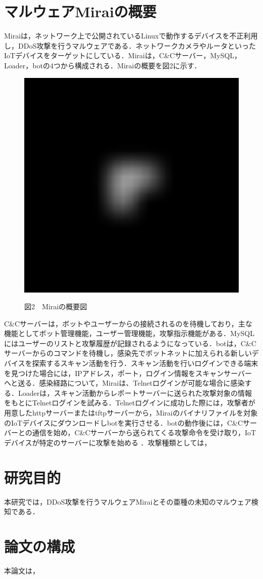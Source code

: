 \section{マルウェアMiraiの概要}

Miraiは，ネットワーク上で公開されているLinuxで動作するデバイスを不正利用し，DDoS攻撃を行うマルウェアである．ネットワークカメラやルータといったIoTデバイスをターゲットにしている．Miraiは，C\&Cサーバー，MySQL，Loader，botの4つから構成される．Miraiの概要を図2に示す．

\begin{figure}[h]
   \centering
      \includegraphics[width=150mm]{figures/test.eps}
   \label{fig:model}
   \begin{center}図2　Miraiの概要図\end{center}
\end{figure}

C\&Cサーバーは，ボットやユーザーからの接続されるのを待機しており，主な機能としてボット管理機能，ユーザー管理機能，攻撃指示機能がある．MySQLにはユーザーのリストと攻撃履歴が記録されるようになっている．botは，C\&Cサーバーからのコマンドを待機し，感染先でボットネットに加えられる新しいデバイスを探索するスキャン活動を行う．スキャン活動を行いログインできる端末を見つけた場合には，IPアドレス，ポート，ログイン情報をスキャンサーバーへと送る．感染経路について，Miraiは、Telnetログインが可能な場合に感染する．Loaderは，スキャン活動からレポートサーバーに送られた攻撃対象の情報をもとにTelnetログインを試みる．Telnetログインに成功した際には，攻撃者が用意したhttpサーバーまたはtftpサーバーから，Miraiのバイナリファイルを対象のIoTデバイスにダウンロードしbotを実行させる．botの動作後には，C\&Cサーバーとの通信を始め，C\&Cサーバーから送られてくる攻撃命令を受け取り，IoTデバイスが特定のサーバーに攻撃を始める
．攻撃種類としては，~~~~~

\section{研究目的}
本研究では，DDoS攻撃を行うマルウェアMiraiとその亜種の未知のマルウェア検知である．

\section{論文の構成}
本論文は，